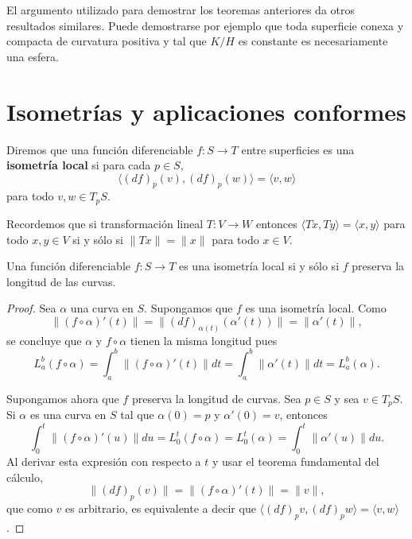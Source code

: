 El argumento utilizado para demostrar los teoremas anteriores da otros
resultados similares. Puede demostrarse por ejemplo que toda superficie conexa
y compacta de curvatura positiva y tal que $K/H$ es constante es necesariamente
una esfera. 

\chapter{Isometrías y aplicaciones conformes}


Diremos que una función diferenciable $f\colon S\to T$ entre superficies es una
\textbf{isometría local} si para cada $p\in S$, 
\[
\langle (df)_p(v),(df)_p(w)\rangle=\langle v,w\rangle
\]
para todo $v,w\in T_pS$. 

Recordemos que si transformación lineal $T\colon V\to W$ entonces $\langle
Tx,Ty\rangle=\langle x,y\rangle$ para todo $x,y\in V$ si y sólo si
$\|Tx\|=\|x\|$ para todo $x\in V$. 

\begin{lemma}
	\label{lem:longitud_curvas}
	Una función diferenciable $f\colon S\to T$ es una isometría local si y sólo
	si $f$ preserva la longitud de las curvas.	
\end{lemma}

\begin{proof}
	Sea $\alpha$ una curva en $S$. 
	Supongamos que $f$ es una isometría local. Como
	\[
		\|(f\circ\alpha)'(t)\|=\|(df)_{\alpha(t)}(\alpha'(t))\|=\|\alpha'(t)\|,
	\]
	se concluye que $\alpha$ y $f\circ\alpha$ tienen la misma longitud pues 
	\[
		L_a^b(f\circ\alpha)=\int_a^b\|(f\circ\alpha)'(t)\|dt=\int_a^b\|\alpha'(t)\|dt=L_a^b(\alpha).
	\]

	Supongamos ahora que $f$ preserva la longitud de curvas. Sea $p\in S$ y sea $v\in T_pS$. Si $\alpha$ es una curva en $S$ 
	tal que $\alpha(0)=p$ y $\alpha'(0)=v$, entonces
	\[
		\int_0^t\|(f\circ\alpha)'(u)\|du=L_0^t(f\circ\alpha)=L_0^t(\alpha)=\int_0^t\|\alpha'(u)\|du.
	\]
	Al derivar esta expresión con respecto a $t$ y usar el teorema fundamental
	del cálculo, 
	\[
		\|(df)_p(v)\|=\|(f\circ\alpha)'(t)\|=\|v\|,
	\]
	que como $v$ es arbitrario, es equivalente a decir que
	$\langle(df)_pv,(df)_pw\rangle=\langle v,w\rangle$.
\end{proof}

